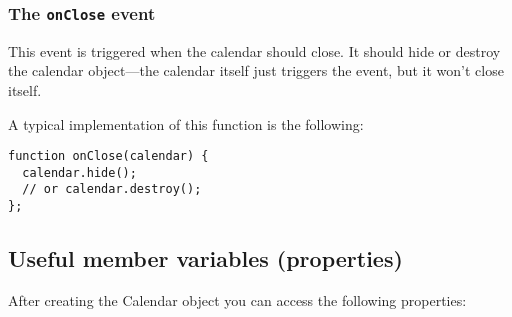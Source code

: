 \documentclass[a4paper,10pt]{article}
\begin{document}
\subsubsection*{The \texttt{onClose} event}\label{sec:Calendar.onClose}

This event is triggered when the calendar should close.  It should hide or
destroy the calendar object---the calendar itself just triggers the event, but
it won't close itself.

A typical implementation of this function is the following:

\begin{verbatim}
function onClose(calendar) {
  calendar.hide();
  // or calendar.destroy();
};
\end{verbatim}

\subsection{Useful member variables (properties)}\label{sec:Calendar.props}

After creating the Calendar object you can access the following properties:
\end{document}
